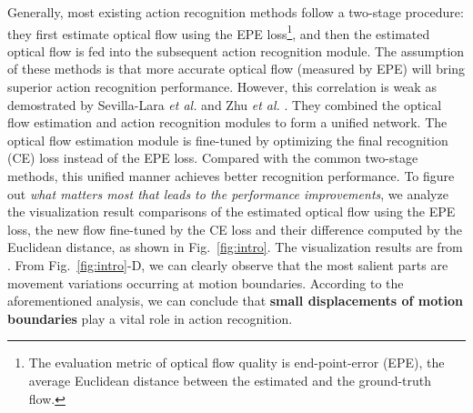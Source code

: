 \documentclass[journal]{IEEEtran}
\begin{document}
Generally, most existing action recognition methods follow a two-stage procedure: they first estimate optical flow using the EPE loss\footnote{The evaluation metric of optical flow quality is end-point-error (EPE), the average Euclidean distance between the estimated and the ground-truth flow.}, and then the estimated optical flow is fed into the subsequent action recognition module. The assumption of these methods is that more accurate optical flow (measured by EPE) will bring superior action recognition performance. However, this correlation is weak as demostrated by Sevilla-Lara \emph{et al.} \cite{sevilla2017integration} and Zhu \emph{et al.} \cite{zhu2017hidden}. They combined the optical flow estimation and action recognition modules to form a unified network. The optical flow estimation module is fine-tuned by optimizing the final recognition (CE) loss instead of the EPE loss. Compared with the common two-stage methods, this unified manner achieves better recognition performance. To figure out \emph{what matters most that leads to the performance improvements}, we analyze the visualization result comparisons of the estimated optical flow using the EPE loss, the new flow fine-tuned by the CE loss and their difference computed by the Euclidean distance, as shown in Fig.~\ref{fig:intro}. The visualization results are from \cite{sevilla2017integration}. From Fig.~\ref{fig:intro}-D, we can clearly observe that the most salient parts are movement variations occurring at motion boundaries. According to the aforementioned analysis, we can conclude that \textbf{small displacements of motion boundaries} play a vital role in action recognition.
\end{document}
